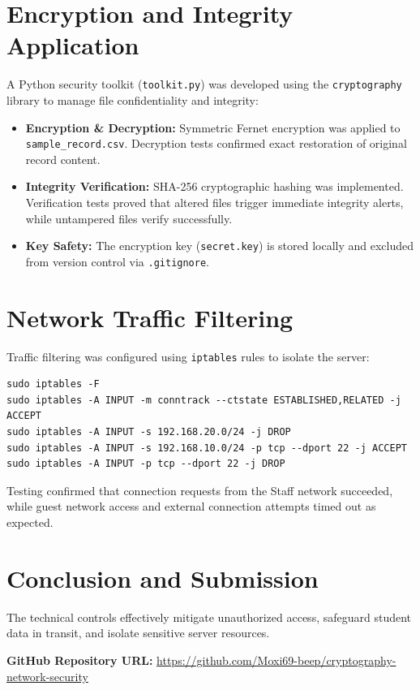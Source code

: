 \documentclass[12pt,a4paper]{article}
\begin{document}
\section{Encryption and Integrity Application}
A Python security toolkit (\texttt{toolkit.py}) was developed using the \texttt{cryptography} library to manage file confidentiality and integrity:
\begin{itemize}
    \item \textbf{Encryption \& Decryption:} Symmetric Fernet encryption was applied to \texttt{sample\_record.csv}. Decryption tests confirmed exact restoration of original record content.
    \item \textbf{Integrity Verification:} SHA-256 cryptographic hashing was implemented. Verification tests proved that altered files trigger immediate integrity alerts, while untampered files verify successfully.
    \item \textbf{Key Safety:} The encryption key (\texttt{secret.key}) is stored locally and excluded from version control via \texttt{.gitignore}.
\end{itemize}

\section{Network Traffic Filtering}
Traffic filtering was configured using \texttt{iptables} rules to isolate the server:
\begin{verbatim}
sudo iptables -F
sudo iptables -A INPUT -m conntrack --ctstate ESTABLISHED,RELATED -j ACCEPT
sudo iptables -A INPUT -s 192.168.20.0/24 -j DROP
sudo iptables -A INPUT -s 192.168.10.0/24 -p tcp --dport 22 -j ACCEPT
sudo iptables -A INPUT -p tcp --dport 22 -j DROP
\end{verbatim}
Testing confirmed that connection requests from the Staff network succeeded, while guest network access and external connection attempts timed out as expected.

\section{Conclusion and Submission}
The technical controls effectively mitigate unauthorized access, safeguard student data in transit, and isolate sensitive server resources.

\textbf{GitHub Repository URL:} \url{https://github.com/Moxi69-beep/cryptography-network-security}
\end{document}
